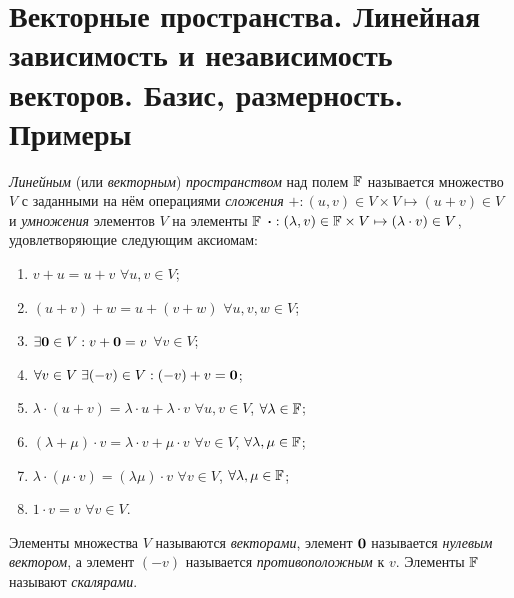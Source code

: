 \section{Векторные пространства. Линейная зависимость и независимость векторов. Базис, размерность. Примеры}

\begin{definition}
    \textit{Линейным} (или \textit{векторным}) \textit{пространством} над полем $\mathbb{F}$ называется множество $V$ с заданными на нём операциями \textit{сложения} $+: (u, v) \in V \times V \mapsto (u + v) \in V$ и \textit{умножения} элементов $V$ на элементы $\mathbb{F}$ $\boldsymbol{\cdot}: (\lambda, v) \in \mathbb{F} \times V \mapsto (\lambda \cdot v) \in V$, удовлетворяющие следующим аксиомам:
    \begin{enumerate}
        \item $v + u = u + v$ $\forall u, v \in V$;
        \item $(u + v) + w = u + (v + w)$ $\forall u, v, w \in V$;
        \item $\exists \boldsymbol{0} \in V: v + \boldsymbol{0} = v$ $\forall v \in V$;\hspace{2.9cm}
        \item $\forall v \in V\;\exists (-v) \in V: (-v) + v = \boldsymbol{0}$;
        \item $\lambda \cdot (u + v) = \lambda \cdot u + \lambda \cdot v$ $\forall u, v \in V$, $\forall \lambda \in \mathbb{F}$;
        \item $(\lambda + \mu) \cdot v = \lambda \cdot v + \mu \cdot v$ $\forall v \in V$, $\forall \lambda, \mu \in \mathbb{F}$;
        \item $\lambda \cdot (\mu \cdot v) = (\lambda\mu) \cdot v$ $\forall v \in V$, $\forall \lambda, \mu \in \mathbb{F}$;\hspace{1cm}
        \item $1 \cdot v = v$ $\forall v \in V$.
    \end{enumerate}
\end{definition}

\begin{definition}
    Элементы множества $V$ называются \textit{векторами}, элемент $\boldsymbol{0}$ называется \textit{нулевым вектором}, а элемент $(-v)$ называется \textit{противоположным} к $v$. Элементы $\mathbb{F}$ называют \textit{скалярами}.
\end{definition}

